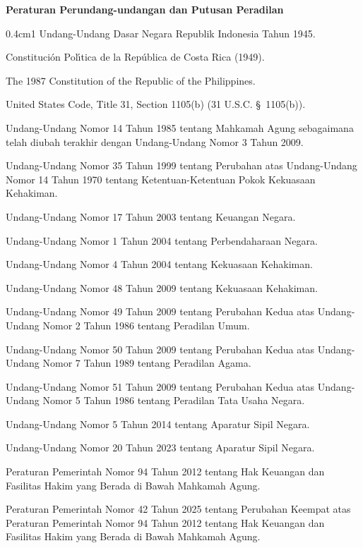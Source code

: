 \documentclass[12pt,a4paper,twocolumn]{article}
\begin{document}
\vspace{0.15em}
{\raggedright\noindent \textbf{Peraturan Perundang-undangan dan Putusan Peradilan}\par}
\begin{hangparas}{0.4cm}{1}
    Undang-Undang Dasar Negara Republik Indonesia Tahun 1945.

    Constituci\'{o}n Pol\'{\i}tica de la Rep\'{u}blica de Costa Rica (1949).

    The 1987 Constitution of the Republic of the Philippines.

    United States Code, Title 31, Section 1105(b) (31 U.S.C. \S\ 1105(b)).

    Undang-Undang Nomor 14 Tahun 1985 tentang Mahkamah Agung sebagaimana telah diubah terakhir dengan Undang-Undang Nomor 3 Tahun 2009.

    Undang-Undang Nomor 35 Tahun 1999 tentang Perubahan atas Undang-Undang Nomor 14 Tahun 1970 tentang Ketentuan-Ketentuan Pokok Kekuasaan Kehakiman.

    Undang-Undang Nomor 17 Tahun 2003 tentang Keuangan Negara.

    Undang-Undang Nomor 1 Tahun 2004 tentang Perbendaharaan Negara.

    Undang-Undang Nomor 4 Tahun 2004 tentang Kekuasaan Kehakiman.

    Undang-Undang Nomor 48 Tahun 2009 tentang Kekuasaan Kehakiman.

    Undang-Undang Nomor 49 Tahun 2009 tentang Perubahan Kedua atas Undang-Undang Nomor 2 Tahun 1986 tentang Peradilan Umum.

    Undang-Undang Nomor 50 Tahun 2009 tentang Perubahan Kedua atas Undang-Undang Nomor 7 Tahun 1989 tentang Peradilan Agama.

    Undang-Undang Nomor 51 Tahun 2009 tentang Perubahan Kedua atas Undang-Undang Nomor 5 Tahun 1986 tentang Peradilan Tata Usaha Negara.

    Undang-Undang Nomor 5 Tahun 2014 tentang Aparatur Sipil Negara.

    Undang-Undang Nomor 20 Tahun 2023 tentang Aparatur Sipil Negara.

    Peraturan Pemerintah Nomor 94 Tahun 2012 tentang Hak Keuangan dan Fasilitas Hakim yang Berada di Bawah Mahkamah Agung.

    Peraturan Pemerintah Nomor 42 Tahun 2025 tentang Perubahan Keempat atas Peraturan Pemerintah Nomor 94 Tahun 2012 tentang Hak Keuangan dan Fasilitas Hakim yang Berada di Bawah Mahkamah Agung.


\end{hangparas}
\end{document}
